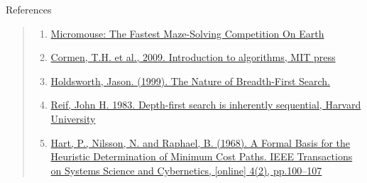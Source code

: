 \documentclass{amsart}
\begin{document}
\begin{section}{References}

    \begin{quote}
        \begin{enumerate}
            \item \href{https://www.youtube.com/watch?v=ZMQbHMgK2rw}{Micromouse: The Fastest Maze-Solving Competition On Earth}
            \item \href{https://dahlan.unimal.ac.id/files/ebooks/2009%20Introduction%20to%20Algorithms%20Third%20Ed.pdf}{Cormen, T.H. et al., 2009. Introduction to algorithms, MIT press}
            \item \href{https://www.researchgate.net/profile/Jason-Holdsworth/publication/2727226_The_Nature_of_Breadth-First_Search/links/5539d8d70cf2239f4e7dad9d/The-Nature-of-Breadth-First-Search.pdf}{Holdsworth, Jason. (1999). The Nature of Breadth-First Search. }
            \item \href{https://users.cs.duke.edu/~reif/paper/dfs.ptime.pdf}{Reif, John H. 1983. Depth-first search is inherently sequential, Harvard University}
            \item \href{https://ieeexplore.ieee.org/document/4082128}{Hart, P., Nilsson, N. and Raphael, B. (1968). A Formal Basis for the Heuristic Determination of Minimum Cost Paths. IEEE Transactions on Systems Science and Cybernetics, [online] 4(2), pp.100–107}

        \end{enumerate}
    \end{quote}
    
\end{section}
\end{document}
